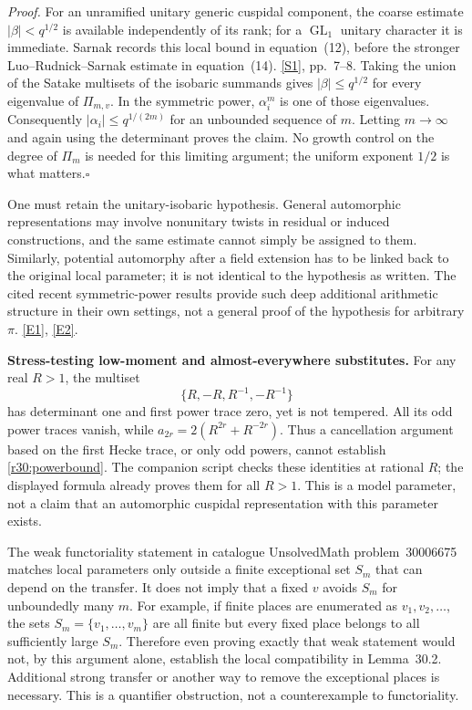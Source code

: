 \documentclass[11pt,a4paper]{article}
\newcommand{\sref}[2]{\hyperlink{source:#1:#2}{[S#2]}}
\newcommand{\eref}[2]{\hyperlink{extra:#1:#2}{[E#2]}}
\numberwithin{equation}{section}
\begin{document}
\emph{Proof.} For an unramified unitary generic cuspidal component, the
coarse estimate $|\beta|<q^{1/2}$ is available independently of its rank;
for a $\operatorname{GL}_1$ unitary character it is immediate. Sarnak
records this local bound in equation~(12), before the stronger
Luo--Rudnick--Sarnak estimate in equation~(14). \sref{9400078}{1}, pp.~7--8.
Taking the union of the Satake multisets of the isobaric summands gives
$|\beta|\le q^{1/2}$ for every eigenvalue of $\Pi_{m,v}$.
In the symmetric power, $\alpha_i^m$ is one of those eigenvalues.
Consequently $|\alpha_i|\le q^{1/(2m)}$ for an unbounded sequence of $m$.
Letting $m\to\infty$ and again using the determinant proves the claim.
No growth control on the degree of $\Pi_m$ is needed for this limiting
argument; the uniform exponent $1/2$ is what matters.\hfill$\square$

One must retain the unitary-isobaric hypothesis. General automorphic
representations may involve nonunitary twists in residual or induced
constructions, and the same estimate cannot simply be assigned to them.
Similarly, potential automorphy after a field extension has to be linked
back to the original local parameter; it is not identical to the
hypothesis as written. The cited recent symmetric-power results provide
such deep additional arithmetic structure in their own settings, not a
general proof of the hypothesis for arbitrary $\pi$. \eref{9400078}{1},
\eref{9400078}{2}.

\medskip
\textbf{Stress-testing low-moment and almost-everywhere substitutes.}
For any real $R>1$, the multiset
\[
               \{R,-R,R^{-1},-R^{-1}\}
\]
has determinant one and first power trace zero, yet is not tempered.
All its odd power traces vanish, while
$a_{2r}=2(R^{2r}+R^{-2r})$. Thus a cancellation argument based on the
first Hecke trace, or only odd powers, cannot establish
\eqref{r30:powerbound}. The companion script checks these identities at
rational $R$; the displayed formula already proves them for all $R>1$.
This is a model parameter, not a claim that an automorphic cuspidal
representation with this parameter exists.

The weak functoriality statement in catalogue UnsolvedMath problem~30006675 matches local
parameters only outside a finite exceptional set $S_m$ that can depend
on the transfer. It does not imply that a fixed $v$ avoids $S_m$ for
unboundedly many $m$. For example, if finite places are enumerated as
$v_1,v_2,\ldots$, the sets $S_m=\{v_1,\ldots,v_m\}$ are all finite but
every fixed place belongs to all sufficiently large $S_m$.
Therefore even proving exactly that weak statement would not, by this
argument alone, establish the local compatibility in Lemma~30.2.
Additional strong transfer or another way to remove the exceptional
places is necessary. This is a quantifier obstruction, not a
counterexample to functoriality.
\end{document}

